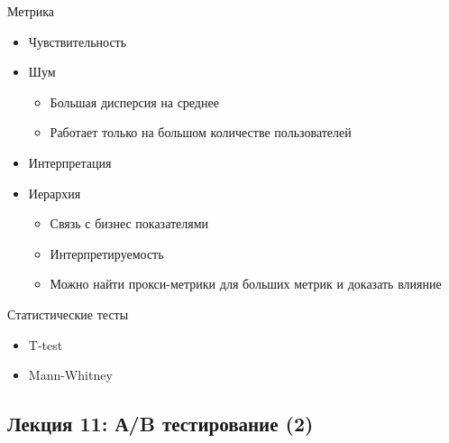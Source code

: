 \documentclass[a4paper, 12pt]{article}
\begin{document}
{Метрика}

\begin{itemize}
\item
  
  Чувствительность
  
\item
  
  Шум
  

  \begin{itemize}
  \item
    
    Большая дисперсия на среднее
    
  \item
    
    Работает только на большом количестве пользователей
    
  \end{itemize}
\item
  
  Интерпретация
  
\item
  
  Иерархия
  

  \begin{itemize}
  \item
    
    Связь с бизнес показателями
    
  \item
    
    Интерпретируемость
    
  \item
    
    Можно найти прокси-метрики для больших метрик и доказать влияние
    
  \end{itemize}
\end{itemize}

{Статистические тесты}

\begin{itemize}
\item
  
  T-test
  
\item
  
  Mann-Whitney
  
\end{itemize}

\subsection{\texorpdfstring{\textbf{Лекция 11: А/B тестирование
(2)}}{Лекция 11: А/B тестирование (2)}}\label{ux43bux435ux43aux446ux438ux44f-11-ux430b-ux442ux435ux441ux442ux438ux440ux43eux432ux430ux43dux438ux435-2}
\end{document}
